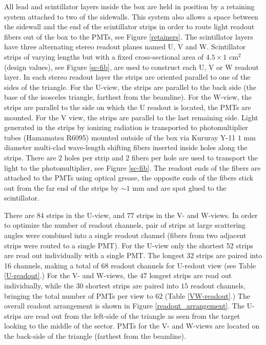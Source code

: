 All lead and scintillator layers inside the box are held in position by a retaining system attached to two of the sidewalls.  This system also allows a space between the sidewall and the end of the scintillator strips in order to route light readout fibers out of the box to the PMTs, see Figure \ref{retainers}. The scintillator layers have three alternating stereo readout planes named U, V and W. Scintillator strips of varying lengths but with a fixed cross-sectional area of $4.5 \times 1$ cm$^2$ (design values), see Figure \ref{sc-fib}, are used to construct each U, V or W readout layer. In each stereo readout layer the strips are oriented parallel to one of the sides of the triangle. For the U-view, the strips are parallel to the back side (the base of the isosceles triangle, farthest from the beamline). For the W-view, the strips are parallel to the side on which the U readout is located, the PMTs are mounted.  For the V view, the strips are parallel to the last remaining side. Light generated in the strips by ionizing radiation is transported to photomultiplier tubes (Hamamatsu R6095) mounted outside of the box via Kururay Y-11 $1$ mm diameter multi-clad wave-length shifting fibers inserted inside holes along the strips. There are $2$ holes per strip and $2$ fibers per hole are used to transport the light to the photomultiplier, see Figure \ref{sc-fib}. The readout ends of the fibers are attached to the PMTs using optical grease, the opposite ends of the fibers stick out from the far end of the strips by $\sim 1$ mm and are spot glued to the scintillator.

There are $84$ strips in the U-view, and $77$ strips in the V- and W-views. In order to optimize the number of readout channels, pair of strips at large scattering angles were combined into a single readout channel (fibers from two adjacent strips were routed to a single PMT). For the U-view only the shortest 52 strips are read out individually with a single PMT. The longest $32$ strips are paired into 16 channels, making a total of $68$ readout channels for U-redout view (see Table \ref{U-readout}.) For the V- and W-views, the $47$ longest strips are read out individually, while the $30$ shortest strips are paired into $15$ readout channels, bringing the total number of PMTs per view to $62$ (Table \ref{VW-readout}.)  The overall readout arrangement is shown in Figure \ref{readout_arrangement}. The U-strips are read out from the left-side of the triangle as seen from the target looking to the middle of the sector.  PMTs for the V- and W-views are located on the back-side of the triangle (farthest from the beamline). 


